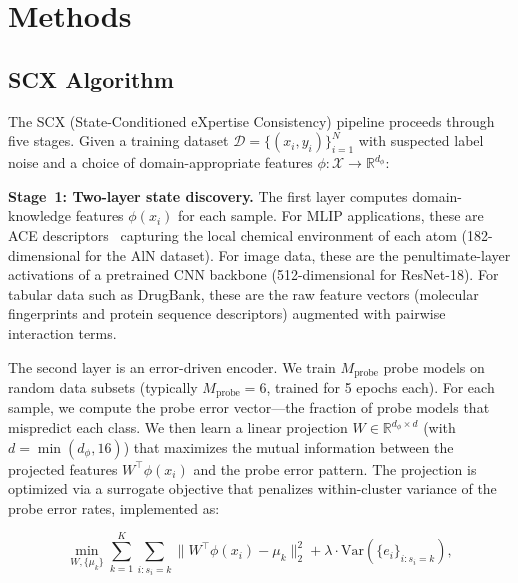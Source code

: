 %

\section{Methods}

\subsection{SCX Algorithm}

The SCX (State-Conditioned eXpertise Consistency) pipeline proceeds through five stages. Given a training dataset $\mathcal{D} = \{(x_i, y_i)\}_{i=1}^N$ with suspected label noise and a choice of domain-appropriate features $\phi \colon \mathcal{X} \to \mathbb{R}^{d_\phi}$:

\textbf{Stage~1: Two-layer state discovery.} The first layer computes domain-knowledge features $\phi(x_i)$ for each sample. For MLIP applications, these are ACE descriptors~\cite{drautz2019ace} capturing the local chemical environment of each atom (182-dimensional for the AlN dataset). For image data, these are the penultimate-layer activations of a pretrained CNN backbone (512-dimensional for ResNet-18). For tabular data such as DrugBank, these are the raw feature vectors (molecular fingerprints and protein sequence descriptors) augmented with pairwise interaction terms.

The second layer is an error-driven encoder. We train $M_{\mathrm{probe}}$ probe models on random data subsets (typically $M_{\mathrm{probe}} = 6$, trained for 5 epochs each). For each sample, we compute the probe error vector---the fraction of probe models that mispredict each class. We then learn a linear projection $W \in \mathbb{R}^{d_\phi \times d}$ (with $d = \min(d_\phi, 16)$) that maximizes the mutual information between the projected features $W^\top \phi(x_i)$ and the probe error pattern. The projection is optimized via a surrogate objective that penalizes within-cluster variance of the probe error rates, implemented as:

\begin{equation}
\min_{W, \{\mu_k\}} \sum_{k=1}^K \sum_{i: s_i = k} \bigl\| W^\top \phi(x_i) - \mu_k \bigr\|_2^2 + \lambda \cdot \mathrm{Var}(\{e_i\}_{i: s_i = k}),
\label{eq:encoder}
\end{equation}

